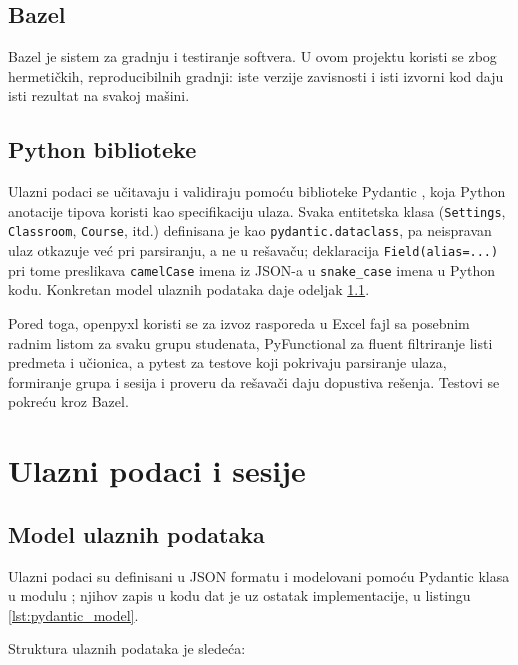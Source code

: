\documentclass[12pt,oneside]{memoir}
\begin{document}
\subsection{Bazel}
\label{sec:bazel}

Bazel \cite{bazel} je sistem za gradnju i testiranje softvera. U ovom
projektu koristi se zbog hermetičkih, reproducibilnih gradnji: iste
verzije zavisnosti i isti izvorni kod daju isti rezultat na svakoj
mašini.

\subsection{Python biblioteke}
\label{sec:pylibs}

Ulazni podaci se učitavaju i validiraju pomoću biblioteke Pydantic
\cite{pydantic}, koja Python anotacije tipova koristi kao specifikaciju
ulaza. Svaka entitetska klasa (\texttt{Settings}, \texttt{Classroom},
\texttt{Course}, itd.) definisana je kao \texttt{pydantic.dataclass},
pa neispravan ulaz otkazuje već pri parsiranju, a ne u rešavaču;
deklaracija \texttt{Field(alias=...)} pri tome preslikava
\texttt{camelCase} imena iz JSON-a u \texttt{snake\_case} imena u
Python kodu. Konkretan model ulaznih podataka daje odeljak
\ref{sec:input_model}.

Pored toga, openpyxl \cite{openpyxl} koristi se za izvoz rasporeda u
Excel fajl sa posebnim radnim listom za svaku grupu studenata,
PyFunctional \cite{pyfunctional} za fluent filtriranje listi predmeta i
učionica, a pytest \cite{pytest} za testove koji pokrivaju parsiranje
ulaza, formiranje grupa i sesija i proveru da rešavači daju dopustiva
rešenja. Testovi se pokreću kroz Bazel.

\section{Ulazni podaci i sesije}
\label{sec:ulazni_podaci}

\subsection{Model ulaznih podataka}
\label{sec:input_model}

Ulazni podaci su definisani u JSON formatu i modelovani pomoću
Pydantic klasa u modulu ; njihov zapis u kodu dat je
uz ostatak implementacije, u listingu \ref{lst:pydantic_model}.

\medskip
Struktura ulaznih podataka je sledeća:
\end{document}
